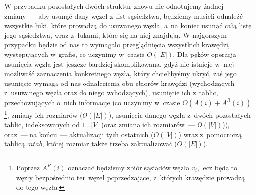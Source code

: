 W przypadku pozostałych dwóch struktur znowu nie odnotujemy żadnej zmiany~---  aby usunąć dany węzeł z~list sąsiedztwa, będziemy musieli odnaleźć wszystkie łuki, które prowadzą do usuwanego węzła, a~na koniec usunąć całą listę jego sąsiedztwa, wraz z~łukami, które się na niej znajdują. W najgorszym przypadku będzie od nas to wymagało przeglądnięcia wszystkich krawędzi, występujących w~grafie, co uczynimy w~czasie $ O \left( \left| E \right| \right) $. Dla pęków operacja usunięcia węzła jest jeszcze bardziej skomplikowana, gdyż nie istnieje w~niej możliwość zaznaczenia konkretnego węzła, który chcielibyśmy ukryć, zaś jego usunięcie wymaga od nas odnalezienia obu zbiorów krawędzi (wychodzących z~usuwanego węzła oraz do niego wchodzących), usunięcie ich z~tablic, przechowujących o~nich informacje (co uczynimy w~czasie $ O \left( A \left( i \right) + A^{R} \left( i \right) \right) $ \footnote{Poprzez $A^{R} \left( i \right) $ oznaczać będziemy zbiór sąsiadów węzła $v_{i}$, lecz będą to węzły bezpośrednio ten węzeł poprzedzające, z~których krawędzie prowadzą do tego węzła.}, zmiany ich rozmiarów ($ O \left( \left| E \right| \right) $), usunięcia danego węzła z~dwóch pozostałych tablic, indeksowanych od $ 1 \ldots \left| V \right| $ (oraz zmiana ich rozmiarów~---  $ O \left( \left| V \right| \right) $)), oraz~--- na końcu~--- aktualizacji tych ostatnich ($ O \left( \left| V \right| \right) $) wraz z~pomocniczą tablicą $mtab$, której rozmiar także trzeba zaktualizować ($ O \left( \left| E \right| \right) $).

